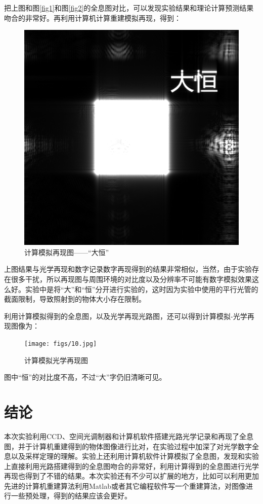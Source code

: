 \documentclass{WHUReport}
\begin{document}
\begin{multicols}{2}
	把上图和图\ref{fig1}和图\ref{fig2}的全息图对比，可以发现实验结果和理论计算预测结果吻合的非常好。再利用计算机计算重建模拟再现，得到：
	\begin{figure}[H]
		\centering
		\includegraphics[width=.8\linewidth]{figs/9.png}
		\caption{计算模拟再现图——“大恒”}
	\end{figure}
	上图结果与光学再现和数字记录数字再现得到的结果非常相似，当然，由于实验存在很多干扰，所以再现图与周围环境的对比度以及分辨率不可能有数字模拟效果这么好。实验中是将“大”和“恒”分开进行实验的，这时因为实验中使用的平行光管的截面限制，导致照射到的物体大小存在限制。
	
	利用计算模拟得到的全息图，以及光学再现光路图，还可以得到计算模拟\mbox{-}光学再现图像为：
	\begin{figure}[H]
		\centering
		\texttt{[image: figs/10.jpg]}
		\caption{计算模拟光学再现图}
	\end{figure}
	图中“恒”的对比度不高，不过“大”字仍旧清晰可见。
	\section{结\quad 论}
	本次实验利用CCD、空间光调制器和计算机软件搭建光路光学记录和再现了全息图，并于计算机重建得到的物体图像进行比对，在实验过程中加深了对光学数字全息以及采样定理的理解。实验上还利用计算机软件计算模拟了全息图，发现和实验上直接利用光路搭建得到的全息图吻合的非常好，利用计算得到的全息图进行光学再现也得到了不错的结果。本次实验还有不少可以扩展的地方，比如可以利用更加先进的计算机重建算法利用Matlab或者其它编程软件写一个重建算法，对图像进行一些预处理，得到的结果应该会更好。
	

\end{multicols}
\end{document}
